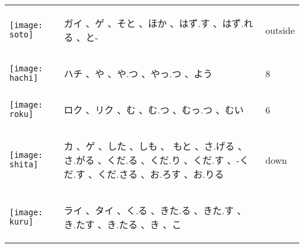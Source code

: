 \documentclass[a4paper,12pt]{extarticle}
\begin{document}
\begin{longtable}{|lp{6cm}p{4cm}|}
\begin{minipage}{0.3\textwidth}
\centerline{
	\texttt{[image: soto]}
}
\end{minipage}
&
\begin{CJK}{UTF8}{min} ガイ 、ゲ 、そと 、ほか 、はず.す 、はず.れる 、と-\end{CJK}
&
 outside
\\ 
\begin{minipage}{0.3\textwidth}
\centerline{
	\texttt{[image: hachi]}
}
\end{minipage}
&
\begin{CJK}{UTF8}{min} ハチ 、や 、や.つ 、やっ.つ 、よう\end{CJK}
&
 8
\\ 
\begin{minipage}{0.3\textwidth}
\centerline{
	\texttt{[image: roku]}
}
\end{minipage}
&
\begin{CJK}{UTF8}{min} ロク 、リク 、む 、む.つ 、むっ.つ 、むい\end{CJK}
&
 6
\\ 
\begin{minipage}{0.3\textwidth}
\centerline{
	\texttt{[image: shita]}
}
\end{minipage}
&
\begin{CJK}{UTF8}{min} カ 、ゲ 、した 、しも 、 もと 、さ.げる 、さ.がる 、くだ.る 、くだ.り 、くだ.す 、-くだ.す 、くだ.さる 、お.ろす 、お.りる\end{CJK}
&
 down
\\ 
\begin{minipage}{0.3\textwidth}
\centerline{
	\texttt{[image: kuru]}
}
\end{minipage}
&
\begin{CJK}{UTF8}{min} ライ 、タイ 、く.る 、きた.る 、きた.す 、き.たす 、き.たる 、き 、こ\end{CJK}

\end{longtable}
\end{document}
